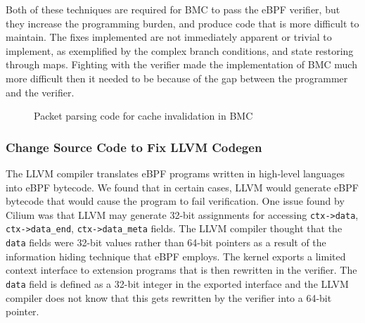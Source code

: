 
Both of these techniques are required for BMC to pass the eBPF verifier, but they
    increase the programming burden, and produce code that is more difficult
    to maintain.
The fixes implemented are not immediately apparent or trivial to implement, as
    exemplified by the complex branch conditions, and state restoring through maps.
Fighting with the verifier made the implementation of BMC much more difficult then
    it needed to be because of the gap between the programmer and the verifier.

\begin{figure}[t]
    
    \vspace{-10pt}
    \caption{Packet parsing code for cache invalidation in BMC}
    \label{fig:bmc-code}
    \vspace{-10pt}
\end{figure}

\subsubsection{Change Source Code to Fix LLVM Codegen}
\label{motivation:llvm-codegen}
The LLVM compiler translates eBPF programs written in high-level languages into eBPF bytecode.
We found that in certain cases, LLVM would generate eBPF bytecode that would cause the program to fail verification.
One issue found by Cilium was that LLVM may generate 32-bit assignments for
    accessing \texttt{ctx->data}, \texttt{ctx->data\_end}, \texttt{ctx->data\_meta} fields.
The LLVM compiler thought that the \texttt{data} fields were 32-bit values rather than 64-bit pointers as
    a result of the information hiding technique that
    eBPF employs.
The kernel exports a limited context interface to extension programs that is then rewritten in the verifier.
The \texttt{data} field is defined as a 32-bit integer in the exported interface and
    the LLVM compiler does not know that this gets rewritten by the verifier into a 64-bit pointer.

